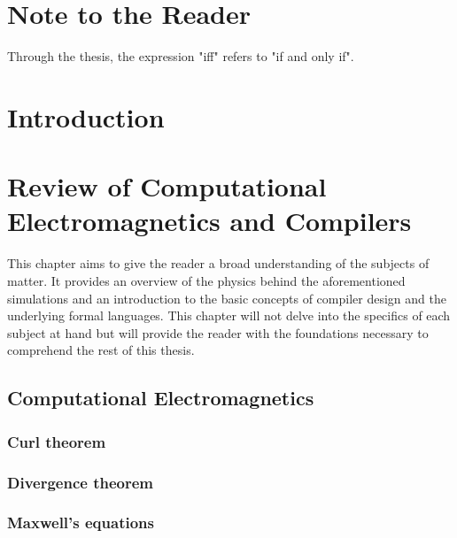 
% 

\chapter{Note to the Reader}
Through the thesis, the expression "iff" refers to "if and only if".

\chapter{Introduction}

\chapter{Review of Computational Electromagnetics and Compilers}
This chapter aims to give the reader a broad understanding of the subjects of matter. It provides an overview of the physics behind the aforementioned simulations and an introduction to the basic concepts of compiler design and the underlying formal languages. This chapter will not delve into the specifics of each subject at hand but will provide the reader with the foundations necessary to comprehend the rest of this thesis.

\section{Computational Electromagnetics}
\subsection*{Curl theorem}
\subsection*{Divergence theorem}
\subsection*{Maxwell's equations}



